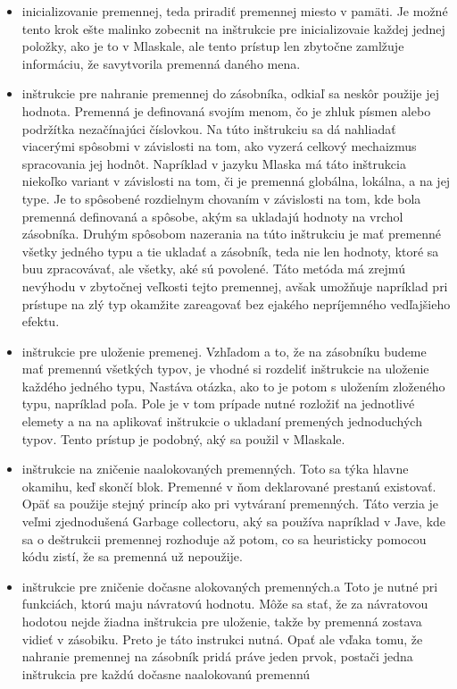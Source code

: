 \begin{itemize}
\item inicializovanie premennej, teda priradiť premennej miesto v pamäti. Je možné tento krok ešte malinko zobecnit na inštrukcie pre inicializovaie každej jednej položky, ako je to v Mlaskale, ale tento prístup len zbytočne zamlžuje informáciu, že savytvorila premenná daného mena.
\item inštrukcie pre nahranie premennej do zásobníka, odkiaľ sa neskôr použije jej hodnota. Premenná je definovaná svojím menom, čo je zhluk písmen alebo podržítka nezačínajúci číslovkou. Na túto inštrukciu sa dá nahliadať viacerými spôsobmi v závislosti na tom, ako vyzerá celkový mechaizmus spracovania jej hodnôt. Napríklad v jazyku Mlaska má táto inštrukcia niekoľko variant v závislosti na tom, či je premenná globálna, lokálna, a na jej type. Je to spôsobené rozdielnym chovaním v závislosti na tom, kde bola premenná definovaná a spôsobe, akým sa ukladajú hodnoty na vrchol zásobníka. Druhým spôsobom nazerania na túto inštrukciu je mať premenné všetky jedného typu a tie ukladať a zásobník, teda nie len hodnoty, ktoré sa buu zpracovávať, ale všetky, aké sú povolené. Táto metóda má zrejmú nevýhodu v zbytočnej veľkosti tejto premennej, avšak umožňuje napríklad pri prístupe na zlý typ okamžite zareagovať bez ejakého nepríjemného vedľajšieho efektu.
\item inštrukcie pre uloženie premenej. Vzhľadom a to, že na zásobníku budeme mať premennú všetkých typov, je vhodné si rozdeliť inštrukcie na uloženie každého jedného typu, Nastáva otázka, ako to je potom s uložením zloženého typu, napríklad poľa. Pole je v tom prípade nutné rozložiť na jednotlivé elemety a na na aplikovať inštrukcie o ukladaní premených jednoduchých typov. Tento prístup je podobný, aký sa použil v Mlaskale.
\item inštrukcie  na zničenie naalokovaných premenných. Toto sa týka hlavne okamihu, keď skončí blok. Premenné v ňom deklarované prestanú existovať. Opäť sa použije stejný princíp ako pri vytváraní premenných. Táto verzia je veľmi zjednodušená Garbage collectoru, aký sa používa napríklad v Jave, kde sa o deštrukcii premennej rozhoduje až potom, co sa heuristicky pomocou kódu zistí, že sa premenná už nepoužije.
\item inštrukcie pre zničenie dočasne alokovaných premenných.a Toto je nutné pri funkciách, ktorú maju návratovú hodnotu. Môže sa stať, že za návratovou hodotou nejde žiadna inštrukcia pre uloženie, takže by premenná zostava vidieť v zásobiku. Preto je táto instrukci nutná. Opať ale vďaka tomu, že nahranie premennej na zásobník pridá práve jeden prvok, postači jedna inštrukcia pre každú dočasne naalokovanú premennú

\end{itemize}
